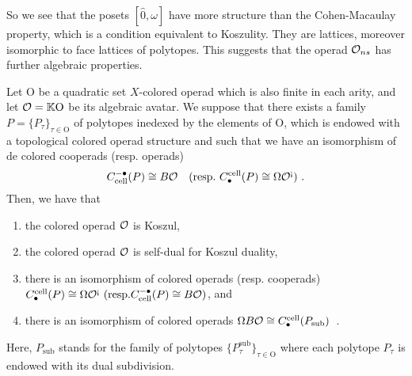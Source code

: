 So we see that the posets $[\hat 0,\omega]$ have more structure than the Cohen-Macaulay property, which is a condition equivalent to Koszulity. They are lattices, moreover isomorphic to face lattices of polytopes. This suggests that the operad $\mathcal{O}_{ns}$ has further algebraic properties. 



\begin{thm} \label{prop:koszulpoincare} Let $\mathrm{O}$ be a quadratic set $X$-colored operad which is also finite in each arity, and let $\mathcal{O}=\mathbb{K} \mathrm{O}$ be its algebraic avatar. We suppose that there exists a family $P=\{P_\tau\}_{\tau \in \mathrm{O}}$ of polytopes inedexed by the elements of $\mathrm{O}$, which is endowed with a topological colored operad structure and such that we have an isomorphism of de colored cooperads (resp. operads) \[C^{-\bullet}_{\mathrm{cell}}(P)\cong B\mathcal{O} \quad (\text{resp.} \ C_{\bullet}^{\mathrm{cell}}(P)\cong \Omega\mathcal{O}^{{\scriptstyle \text{\rm !`}}})\ . \] Then, we have that
    \begin{enumerate}
        \item the colored operad $\mathcal{O}$ is Koszul, 
        \item the colored operad $\mathcal{O}$ is self-dual for Koszul duality, 
        \item there is an isomorphism of colored operads (resp. cooperads)  $C_{\bullet}^{\mathrm{cell}}(P)\cong \Omega\mathcal{O}^{{\scriptstyle \text{\rm !`}}} \ (\text{resp.} C^{-\bullet}_{\mathrm{cell}}(P)\cong B\mathcal{O})$, and
        \item there is an isomorphism of colored operads $\Omega B \mathcal{O} \cong C_{\bullet}^{\mathrm{cell}}(P_\mathrm{sub})$\ .
    \end{enumerate} 
\end{thm}
Here, $P_\mathrm{sub}$ stands for the family of polytopes $\{P_\tau^{\mathrm{sub}}\}_{\tau \in \mathrm{O}}$ where each polytope $P_\tau$ is endowed with its dual subdivision.
